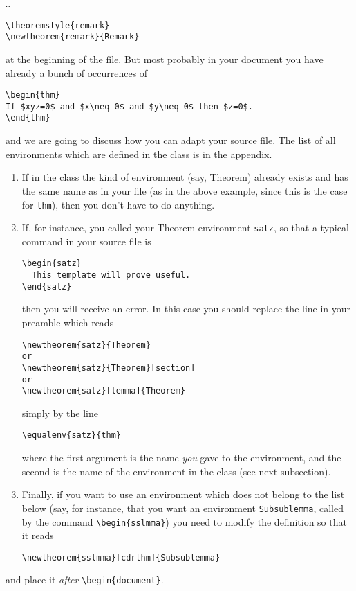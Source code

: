 \documentclass[Unicode]{cedram-alco}
\begin{document}
\noindent\texttt{\dots}
\begin{verbatim}
\theoremstyle{remark}
\newtheorem{remark}{Remark}
\end{verbatim}
at the beginning of the file. But most probably in your document you have already a bunch of occurrences of
\begin{verbatim}
\begin{thm}
If $xyz=0$ and $x\neq 0$ and $y\neq 0$ then $z=0$.
\end{thm}
\end{verbatim}
and we are going to discuss how you can adapt your source file. The list of all environments which are defined in the class is in the appendix.
\begin{enumerate}[label=(\arabic*)]
\item \label{equal} If in the class the kind of environment (say, Theorem) already exists and has the same name as in your file (as in the above example, since this is the case for \verb|thm|), then you don't have to do anything.
\item \label{equalenv} If, for instance, you called your Theorem environment \verb|satz|, so that a typical command in your source file is
\begin{verbatim}
\begin{satz}
  This template will prove useful.
\end{satz}
\end{verbatim}
  then you will receive an error. In this case you should replace the
  line in your preamble which reads
\begin{verbatim}
\newtheorem{satz}{Theorem}
or
\newtheorem{satz}{Theorem}[section]
or
\newtheorem{satz}[lemma]{Theorem}
\end{verbatim}
simply by the line
\begin{verbatim}
\equalenv{satz}{thm}
\end{verbatim}
where the first argument is the name \emph{you} gave to the
environment, and the second is the name of the environment in the
class (see next subsection).
\item \label{cdrthm} Finally, if you want to use an environment which
  does not belong to the list below (say, for instance, that you want
  an environment \verb|Subsublemma|, called by the command
  \verb|\begin{sslmma}|) you need to modify the definition so that it
    reads
\begin{verbatim}
\newtheorem{sslmma}[cdrthm]{Subsublemma}
\end{verbatim}
  \end{enumerate}
  and place it \emph{after} \verb|\begin{document}|.
\end{document}
